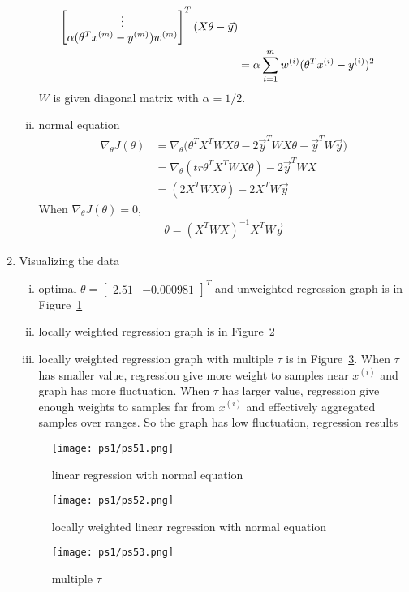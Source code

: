 \documentclass[11pt]{article}
\newcommand{\rvect}[1]{\begin{bmatrix} #1 \end{bmatrix}}
\begin{document}
\begin{enumerate}
\begin{enumerate}[i.]
\begin{align*}
\begin{bmatrix}
      \vdots\\
      \alpha(\theta^Tx^{(m)}-y^{(m)})w^{(m)}\\
    \end{bmatrix}^T(X\theta-\vec{y})\\
    &=\alpha\sum_{i=1}^{m}w^{(i)}(\theta^Tx^{(i)}-y^{(i)})^2\\
  \end{align*}
  $W$ is given diagonal matrix with $\alpha=1/2$.
\item normal equation
  \begin{align*}
    \nabla_\theta J(\theta)
    &= \nabla_\theta \big( \theta^TX^TWX\theta-2\vec{y}^TWX\theta+\vec{y}^TW\vec{y} \big) \\
    &= \nabla_\theta (tr  \theta^TX^TWX\theta)-2\vec{y}^TWX\\
    &= (2X^TWX\theta)-2X^TW\vec{y}
  \end{align*}
  When $\nabla_\theta J(\theta) = 0$, 
  \begin{align*}
    \theta = (X^TWX)^{-1}X^TW\vec{y}
  \end{align*}
  \end{enumerate}
\item Visualizing the data\\
  \begin{enumerate}[i.]
  \item optimal $\theta = \rvect{2.51 &-0.000981}^T$ and unweighted regression graph is in Figure~\ref{fig2}
  \item locally weighted regression graph is in Figure~\ref{fig3}
  \item locally weighted regression graph with multiple $\tau$ is in Figure~\ref{fig4}.
    When $\tau$ has smaller value, regression give more weight to samples near $x^{(i)}$ and
    graph has more fluctuation. 
    When $\tau$ has larger value, regression give enough weights to samples far from $x^{(i)}$ and
    effectively aggregated samples over ranges. So the graph has low fluctuation, 
    regression results 
  \end{enumerate}
\begin{figure}[!htbp]
  \begin{center}
    \texttt{[image: ps1/ps51.png]}
    \caption{linear regression with normal equation}\label{fig2}
  \end{center}
\end{figure}
\begin{figure}[!htbp]
  \begin{center}
    \texttt{[image: ps1/ps52.png]}
    \caption{locally weighted linear regression with normal equation}\label{fig3}
  \end{center}
\end{figure}
\begin{figure}[!htbp]
  \begin{center}
    \texttt{[image: ps1/ps53.png]}
    \caption{multiple $\tau$}\label{fig4}
  \end{center}
\end{figure}


\end{enumerate}
\end{document}
